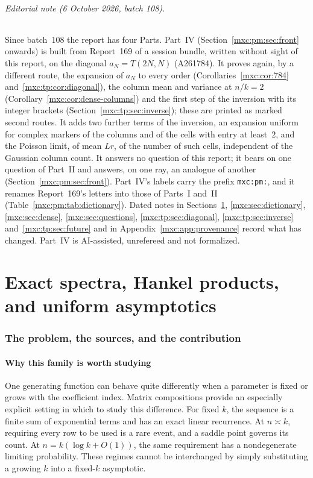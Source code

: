 \documentclass[11pt]{article}
\numberwithin{equation}{section}
\theoremstyle{definition}
\theoremstyle{remark}
\begin{document}
\paragraph{Editorial note (6 October 2026, batch 108).}
Since batch~108 the report has four Parts. Part~IV
(Section~\ref{mxc:pm:sec:front} onwards) is built from Report~169 of a
session bundle, written without sight of this report, on the diagonal
$a_N=T(2N,N)$ (A261784). It proves again, by a different route, the
expansion of $a_N$ to every order (Corollaries~\ref{mxc:cor:784}
and~\ref{mxc:tp:cor:diagonal}), the column mean and variance at $n/k=2$
(Corollary~\ref{mxc:cor:dense-columns}) and the first step of the inversion
with its integer brackets (Section~\ref{mxc:tp:sec:inverse}); these are
printed as marked second routes. It adds two further terms of the inversion,
an expansion uniform for complex markers of the columns and of the cells
with entry at least~$2$, and the Poisson limit, of mean $Lr$, of the number
of such cells, independent of the Gaussian column count. It answers no
question of this report; it bears on one question of Part~II and answers, on one
ray, an analogue of another (Section~\ref{mxc:pm:sec:front}). Part~IV's labels carry
the prefix \texttt{mxc:pm:}, and it renames Report~169's letters into those of
Parts~I and~II (Table~\ref{mxc:pm:tab:dictionary}). Dated notes in
Sections~\ref{mxc:sec:scope}, \ref{mxc:sec:dictionary}, \ref{mxc:sec:dense},
\ref{mxc:sec:questions}, \ref{mxc:tp:sec:diagonal}, \ref{mxc:tp:sec:inverse}
and~\ref{mxc:tp:sec:future} and in Appendix~\ref{mxc:app:provenance} record
what has changed. Part~IV is AI-assisted, unrefereed and not formalized.

\newpage
\tableofcontents
\newpage

\part{Exact spectra, Hankel products, and uniform asymptotics}
\label{mxc:part:one}

\section{The problem, the sources, and the contribution}\label{mxc:sec:scope}

\subsection{Why this family is worth studying}
One generating function can behave quite differently when a parameter is
fixed or grows with the coefficient index. Matrix compositions provide an
especially explicit setting in which to study this difference. For fixed
$k$, the sequence is a finite sum of exponential terms and has an exact
linear recurrence. At $n\asymp k$, requiring every row to be used is a rare
event, and a saddle point governs its count. At $n=k(\log k+O(1))$, the
same requirement has a nondegenerate limiting probability. These regimes
cannot be interchanged by simply substituting a growing $k$ into a
fixed-$k$ asymptotic.
\end{document}
